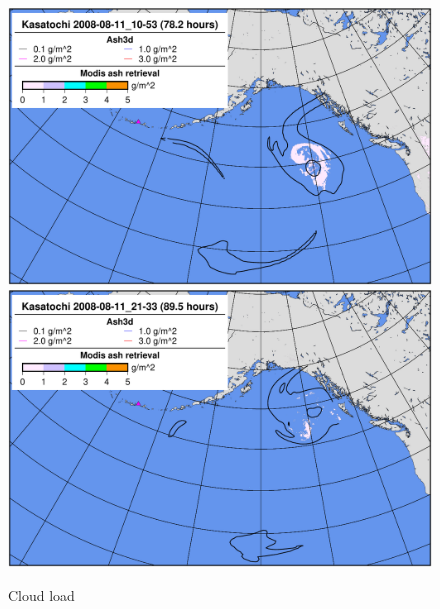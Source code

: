 \begin{figure}[htbp]
\includegraphics[angle=0,scale=0.3]{Figures/TestCase_Results/ValidTest/Kasatochi_CloudLoad_6.pdf}
\includegraphics[angle=0,scale=0.3]{Figures/TestCase_Results/ValidTest/Kasatochi_CloudLoad_7.pdf}
\parbox{15cm}{\caption{\label{FigTestValKasatochi} Cloud load}}
\end{figure}

\clearpage
